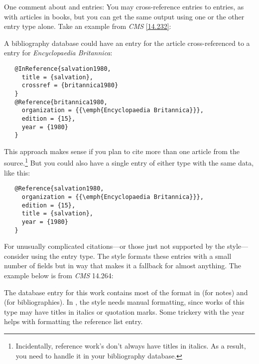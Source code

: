 \documentclass[11pt,letterpaper,oneside]{article}
\begin{document}
One comment about  and 
entries: You may cross-reference  entries to
 entries, as with articles in books, but you can
get the same output using one or the other entry type alone. Take an
example from \textit{CMS} \ref{14.232}:

\begin{citeonly}
\item \cite{salvation1980}
\end{citeonly}

A bibliography database could have an  entry for
the article cross-referenced to a  entry for
\textit{Encyclopaedia Britannica}:

\begin{verbatim}
   @InReference{salvation1980,
     title = {salvation},
     crossref = {britannica1980}
   }
   @Reference{britannica1980,
     organization = {{\emph{Encyclopaedia Britannica}}},
     edition = {15},
     year = {1980}
   }
\end{verbatim}

\noindent This approach makes sense if you plan to cite more than one
article from the source.\footnote{Incidentally, reference work's don't
always have titles in italics. As a result, you need to handle it in
your bibliography database.} But you could also have a single entry of
either type with the same data, like this:

\begin{verbatim}
   @Reference{salvation1980,
     organization = {{\emph{Encyclopaedia Britannica}}},
     edition = {15},
     title = {salvation},
     year = {1980}
   }
\end{verbatim}

For unusually complicated ci\-ta\-tions---or those just not supported
by the style---consider using the  entry type. The style
formats these entries with a small number of fields but in way that
makes it a fallback for almost anything. The example below is from
\textit{CMS} 14.264:

\begin{citebib}
\item \cite{roosevelt1959}
\end{citebib}

\noindent The database entry for this work contains most of the format
in  (for notes) and  (for
bibliographies). In , the style needs manual
formatting, since works of this type may have titles in italics or
quotation marks. Some trickery with the year helps with formatting the
reference list entry.
\end{document}
